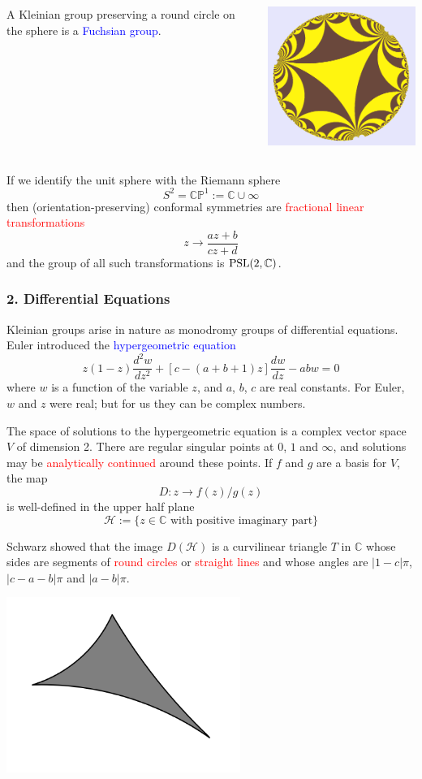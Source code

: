 \documentclass{beamer}
\def\HH{\mathcal{H}}
\def\CP{\mathbb{CP}}
\def\C{\mathbb{C}}
\def\PSL{\textnormal{PSL}}
\begin{document}
\frame
{
\begin{columns}[c]
\column{1.1in}
A Kleinian group 
preserving a round circle
on the sphere is a
\textcolor{blue}{Fuchsian group}.
\column{3in}
\begin{center}
\includegraphics[width=3in]{fuchsian.png}
\end{center}
\end{columns}
}
\frame
{
If we identify the unit sphere with the \textcolor{dgreen}{Riemann sphere} 
$$S^2 = \CP^1:=\C\cup \infty$$
then (orientation-preserving) conformal symmetries are \textcolor{red}{fractional linear
transformations}
$$z \to \frac {az+b} {cz+d}$$
and the group of all such transformations is $\PSL(2,\C)$.
}
\frame
{
\frametitle{2. Differential Equations}

Kleinian groups arise in nature as monodromy groups of \textcolor{dgreen}{differential equations}.
\vskip 5pt
Euler introduced the \textcolor{blue}{hypergeometric equation}
$$z(1-z)\frac {d^2w}{dz^2} + [c - (a+b+1)z]\frac {dw}{dz} - abw = 0$$
where $w$ is a function of the variable $z$, and $a$, $b$, $c$ are real constants.
\vskip 10pt
For Euler, $w$ and $z$ were real; but for us they can be complex numbers.
}
\frame
{The space of solutions to the hypergeometric equation
is a complex vector space $V$ of dimension 2. 
\vskip 10pt
There are \textcolor{dgreen}{regular singular points}
at $0$, $1$ and $\infty$, and solutions may be \textcolor{red}{analytically continued} 
around these points.
\vskip 10pt
If $f$ and $g$ are a basis for $V$, the map $$D:z \to f(z)/g(z)$$ is well-defined
in the \textcolor{dgreen}{upper half plane}
$$\HH:=\lbrace z \in \C \text{ with positive imaginary part} \rbrace$$
}
\frame
{
Schwarz showed that the image $D(\HH)$ is a \textcolor{dgreen}{curvilinear triangle} $T$ in $\C$
whose sides are segments of \textcolor{red}{round circles} or \textcolor{red}{straight lines}
and whose angles are $|1-c|\pi$, $|c-a-b|\pi$ and $|a-b|\pi$.
\begin{center}
\includegraphics[width=3in]{Schwarz_triangle.png}
\end{center}
}
\end{document}
